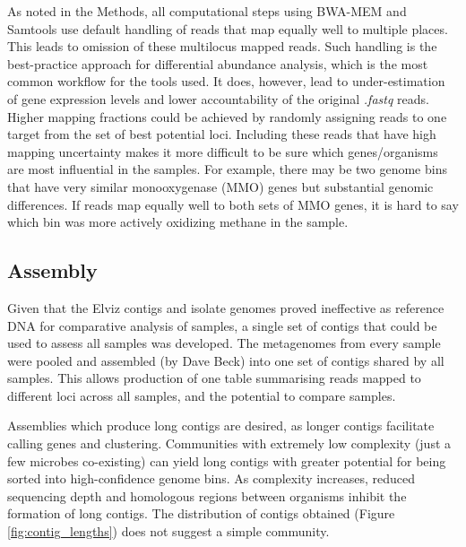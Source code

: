As noted in the Methods, all computational steps using BWA-MEM and Samtools use default handling of reads that map equally well to multiple places.
This leads to omission of these multilocus mapped reads.
Such handling is the best-practice approach for differential abundance analysis, which is the most common workflow for the tools used.
It does, however, lead to under-estimation of gene expression levels and lower accountability of the original \textit{.fastq} reads. %
Higher mapping fractions could be achieved by randomly assigning reads to one target from the set of best potential loci.
Including these reads that have high mapping uncertainty makes it more difficult to be sure which genes/organisms are most influential in the samples.
For example, there may be two genome bins that have very similar monooxygenase (MMO) genes \cite{gilbert2000} but substantial genomic differences.
If reads map equally well to both sets of MMO genes, it is hard to say which bin was more actively oxidizing methane in the sample.

\subsection{Assembly}

Given that the Elviz contigs and isolate genomes proved ineffective as reference DNA for comparative analysis of samples, a single set of contigs that could be used to assess all samples was developed.
The metagenomes from every sample were pooled and assembled (by Dave Beck) into one set of contigs shared by all samples.
This allows production of one table summarising reads mapped to different loci across all samples, and the potential to compare samples.

Assemblies which produce long contigs are desired, as longer contigs facilitate calling genes and clustering.
Communities with extremely low complexity (just a few microbes co-existing) can yield long contigs with greater potential for being sorted into high-confidence genome bins. %
As complexity increases, reduced sequencing depth and homologous regions between organisms inhibit the formation of long contigs.
The distribution of contigs obtained (Figure \ref{fig:contig_lengths}) does not suggest a simple community.


